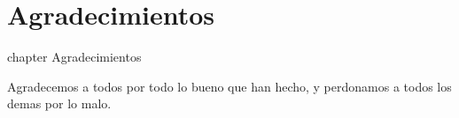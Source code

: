 \chapter*{Agradecimientos}
 {chapter} {Agradecimientos}%

Agradecemos a todos por todo lo bueno que han hecho, y perdonamos a todos los demas por lo malo.

